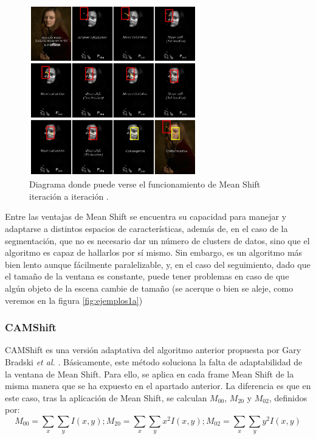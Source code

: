 \begin{figure}
    \centering
    \includegraphics[width=0.65\textwidth]{images/meanshift}
    \caption{Diagrama donde puede verse el funcionamiento de Mean Shift iteración a iteración \cite{wiki:meanshift}.}
    \label{fig:meanshiftopencv}
\end{figure}


Entre las ventajas de Mean Shift se encuentra su capacidad para manejar y adaptarse a distintos espacios de características, además de, en el caso de la segmentación, que no es necesario dar un número de clusters de datos, sino que el algoritmo es capaz de hallarlos por sí mismo. Sin embargo, es un algoritmo más bien lento aunque fácilmente paralelizable, y, en el caso del seguimiento, dado que el tamaño de la ventana es constante, puede tener problemas en caso de que algún objeto de la escena cambie de tamaño (se acerque o bien se aleje, como veremos en la figura \ref{fig:ejemplos1a})

\subsubsection*{CAMShift}

CAMShift es una versión adaptativa del algoritmo anterior propuesta por Gary Bradski \textit{et al.} \cite{art:camshift}. Básicamente, este método soluciona la falta de adaptabilidad de la ventana de Mean Shift. Para ello, se aplica en cada frame Mean Shift de la misma manera que se ha expuesto en el apartado anterior. La diferencia es que en este caso, tras la aplicación de Mean Shift, se calculan $M_{00}$, $M_{20}$ y $M_{02}$, definidos por:
\[
  M_{00} = \sum_x \sum_y I(x,y) ; M_{20} = \sum_x \sum_y x^2 I(x,y) ; M_{02} = \sum_x \sum_y y^2 I(x,y)
\]

